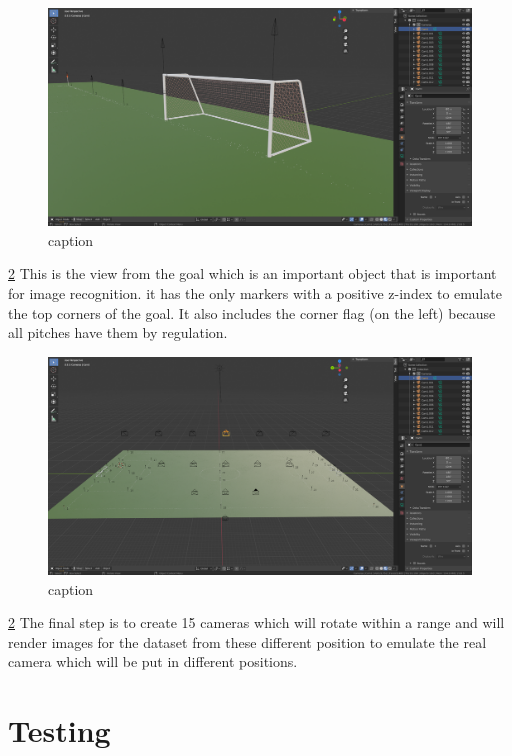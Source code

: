 \documentclass[
11pt,
twoside
]{report}
\begin{document}
\begin{figure}[H]
    \includegraphics[keepaspectratio, width=\columnwidth]{Screenshot_2022-03-05_12-47-42.png}
    \caption{caption}
    \label{img:1}
\end{figure}
\ref{img:1} This is the view from the goal which is an important object that is important for image recognition. it has the only markers with a positive z-index to emulate the top corners of the goal. It also includes the corner flag (on the left) because all pitches have them by regulation.

\begin{figure}[H]
    \includegraphics[keepaspectratio, width=\columnwidth]{Screenshot_2022-03-05_12-05-23.png}
    \caption{caption}
    \label{img:1}
\end{figure}
\ref{img:1} The final step is to create 15 cameras which will rotate within a range and will render images for the dataset from these different position to emulate the real camera which will be put in different positions.






\chapter{Testing}
\end{document}
